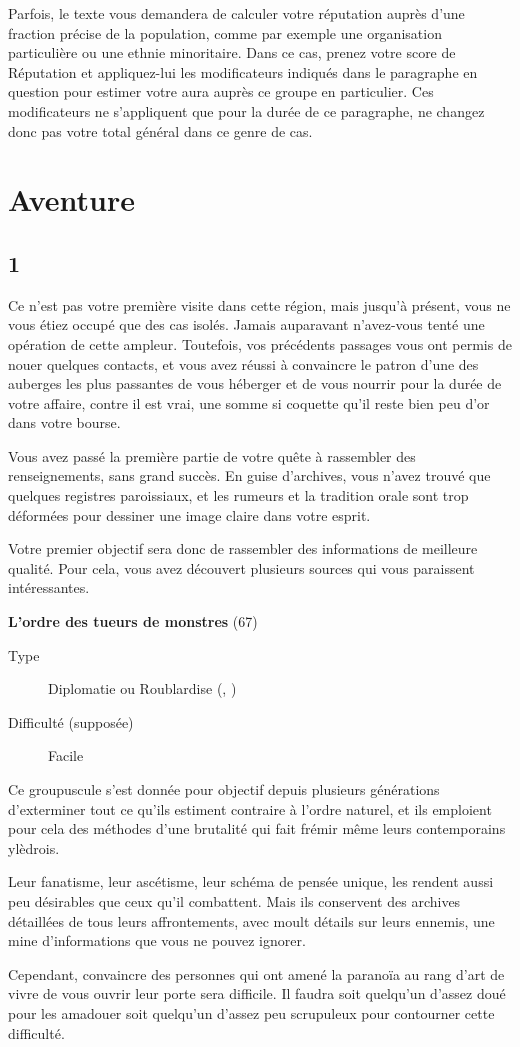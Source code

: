 \documentclass{report}
\newcommand{\gsection}[1]{
    \section{#1}
    \label{section-#1}
}
\newcommand{\quest}[5]{
    \begin{mdframed}[innertopmargin=0.5cm,innerbottommargin=0.5cm,leftmargin=0.5cm,rightmargin=0.5cm]
        \begin{center}
            \textbf{#1} (#2)
        \end{center}
        \begin{description}
            \item[Type] #3
            \item[Difficulté (supposée)] #4
        \end{description}
        #5
    \end{mdframed}
}
\begin{document}
Parfois, le texte vous demandera de calculer votre réputation auprès d'une fraction précise de la population, comme par exemple une organisation particulière ou une ethnie minoritaire. Dans ce cas, prenez votre score de Réputation et appliquez-lui les modificateurs indiqués dans le paragraphe en question pour estimer votre aura auprès ce groupe en particulier. Ces modificateurs ne s'appliquent que pour la durée de ce paragraphe, ne changez donc pas votre total général dans ce genre de cas.

\chapter{Aventure}

\gsection{1}

Ce n'est pas votre première visite dans cette région, mais jusqu'à présent, vous ne vous étiez occupé que des cas isolés. Jamais auparavant n'avez-vous tenté une opération de cette ampleur. Toutefois, vos précédents passages vous ont permis de nouer quelques contacts, et vous avez réussi à convaincre le patron d'une des auberges les plus passantes de vous héberger et de vous nourrir pour la durée de votre affaire, contre il est vrai, une somme si coquette qu'il reste bien peu d'or dans votre bourse.

Vous avez passé la première partie de votre quête à rassembler des renseignements, sans grand succès. En guise d'archives, vous n'avez trouvé que quelques registres paroissiaux, et les rumeurs et la tradition orale sont trop déformées pour dessiner une image claire dans votre esprit.

Votre premier objectif sera donc de rassembler des informations de meilleure qualité. Pour cela, vous avez découvert plusieurs sources qui vous paraissent intéressantes.

\quest{L'ordre des tueurs de monstres}{67}{Diplomatie ou Roublardise (\ankh, \cross)}{Facile}{
Ce groupuscule s'est donnée pour objectif depuis plusieurs générations d'exterminer tout ce qu'ils estiment contraire à l'ordre naturel, et ils emploient pour cela des méthodes d'une brutalité qui fait frémir même leurs contemporains ylèdrois.

Leur fanatisme, leur ascétisme, leur schéma de pensée unique, les rendent aussi peu désirables que ceux qu'il combattent. Mais ils conservent des archives détaillées de tous leurs affrontements, avec moult détails sur leurs ennemis, une mine d'informations que vous ne pouvez ignorer.

Cependant, convaincre des personnes qui ont amené la paranoïa au rang d'art de vivre de vous ouvrir leur porte sera difficile. Il faudra soit quelqu'un d'assez doué pour les amadouer soit quelqu'un d'assez peu scrupuleux pour contourner cette difficulté.
}
\end{document}

